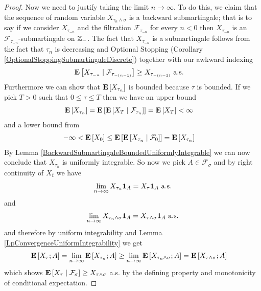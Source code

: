 \begin{proof}
Now we need to justify taking the limit $n \to \infty$.  To do this,
we claim that the sequence of random variable $X_{\tau_n \wedge
  \sigma}$ is a backward submartingale; that is to say if we consider
$X_{\tau_{-n}}$ and the filtration
$\mathcal{F}_{\tau_{-n}}$ for every $n < 0$
then $X_{\tau_{-n}}$ is an $\mathcal{F}_{\tau_{-n}}$-submartingale on
$\integers_-$.  The fact that $X_{\tau_{-n}}$ is a submartingale
follows from the fact that $\tau_n$ is decreasing and Optional
Stopping (Corollary \ref{OptionalStoppingSubmartingaleDiscrete})
together
with our awkward indexing
\begin{align*}
\cexpectationlong{\mathcal{F}_{\tau_{-(n-1)}}}{X_{\tau_{-n}}} &\geq
X_{\tau_{-(n-1)}} \text{ a.s.}
\end{align*}
Furthermore we can show that $\expectation{X_{\tau_n}}$ is bounded
because $\tau$ is bounded.
If we pick $T > 0$ such that $0 \leq \tau \leq T$ then we have an upper bound
\begin{align*}
\expectation{X_{\tau_{n}}}
&=\expectation{\cexpectationlong{\mathcal{F}_{\tau_n}}{X_{T}}} =
\expectation{X_T} < \infty
\end{align*}
and a lower bound from 
\begin{align*}
-\infty &< \expectation{X_0} \leq
\expectation{\cexpectationlong{\mathcal{F}_0}{X_{\tau_n}}} = \expectation{X_{\tau_n}}
\end{align*}
By Lemma \ref{BackwardSubmartingaleBoundedUniformlyIntegrable} we can
now conclude that $X_{\tau_{n}}$ is uniformly integrable.
So now we pick $A \in \mathcal{F}_{\sigma}$ and by right continuity of
$X_t$ we have
\begin{align*}
\lim_{n \to \infty} X_{\tau_n} \characteristic{A} = X_\tau
\characteristic{A} \text{ a.s.}
\end{align*}
and
\begin{align*}
\lim_{n \to \infty} X_{\tau_n \wedge \sigma} \characteristic{A} =
X_{\tau \wedge \sigma}
\characteristic{A} \text{ a.s.}
\end{align*}
and therefore by uniform integrability and Lemma
\ref{LpConvergenceUniformIntegrability} we get
\begin{align*}
\expectation{X_\tau ; A} &= \lim_{n \to \infty}
\expectation{X_{\tau_n} ; A} \geq 
\lim_{n \to \infty} \expectation{X_{\tau_n \wedge \sigma} ; A} =
\expectation{X_{\tau \wedge \sigma} ; A}
\end{align*}
which shows $\cexpectationlong{\mathcal{F}_\sigma}{X_\tau} \geq
X_{\tau \wedge \sigma}$ a.s. by the defining property and monotonicity
of conditional expectation.
\end{proof}

